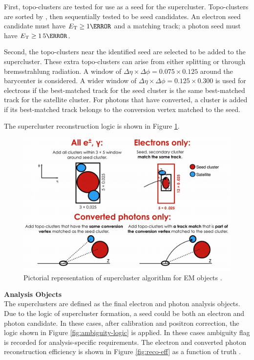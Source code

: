 First, topo-clusters are tested for use as a seed for the supercluster. Topo-clusters are sorted by \et, then sequentially tested to be seed candidates. An electron seed candidate must have $\et \geq \unit{1}{\GeV}$ and a matching track; a photon seed must have $\et \geq \unit{1.5}{\GeV}$. 

Second, the topo-clusters near the identified seed are selected to be added to the supercluster. These extra topo-clusters can arise from either splitting or through bremsstrahlung radiation. A window of $\Delta \eta \times \Delta \phi = 0.075 \times 0.125$ around the barycenter is considered. A wider window of $\Delta \eta \times \Delta \phi = 0.125 \times 0.300$ is used for electrons if the best-matched track for the seed cluster is the same best-matched track for the satellite cluster. For photons that have converted, a cluster is added if its best-matched track belongs to the conversion vertex matched to the seed.

The supercluster reconstruction logic is shown in Figure \ref{fig:supercluster-reco}.

\begin{figure}[h]
    \centering
    \includegraphics[width=.90\textwidth]{chapters/chapter3_eventreco/images/supercluster-formation.png}

    \caption[Pictorial representation of supercluster algorithm for \gls{EM} objects]{Pictorial representation of supercluster algorithm for \gls{EM} objects \cite{photon-electron-perf}.}
    \label{fig:supercluster-reco}
\end{figure}

\noindent\textbf{Analysis Objects}\\ 
\indent The superclusters are defined as the final electron and photon analysis objects. Due to the logic of supercluster formation, a seed could be both an electron and photon candidate. In these cases, after calibration and positron correction, the logic shown in Figure \ref{fig:ambiguity-logic} is applied. In these cases ambiguity flag is recorded for analysis-specific requirements. The electron and converted photon reconstruction efficiency is shown in Figure \ref{fig:reco-eff} as a function of truth \et.

